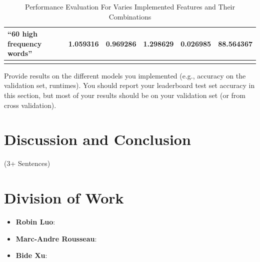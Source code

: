 \documentclass{amsart}
\theoremstyle{definition}
\theoremstyle{remark}
\numberwithin{equation}{section}
\begin{document}
\begin{table}[]
\begin{tabular}{|l|l|l|l|l|l|}
\textbf{“60 high frequency  words”}                                                                                                                                       & 1.059316                                                                    & 0.969286                                                                      & 1.298629                                                                   & 0.026985                                                            & 88.564367                                                                                                                                                     \\ \hline
                                                                                                                                                    \\ \hline
\end{tabular}
\caption{Performance Evaluation For Varies Implemented Features and Their Combinations}
\label{tbl:table_fp}
\end{table}


Provide results on the different models
you implemented (e.g., accuracy on the validation set, runtimes). You should report your leaderboard
test set accuracy in this section, but most of your results should be on your validation set (or from cross
validation).
\section{Discussion and Conclusion}(3+ Sentences)
\section{Division of Work}
\begin{itemize}
\item{\textbf{Robin Luo}}:
\item{\textbf{Marc-Andre Rousseau}}:
\item{\textbf{Bide Xu}}:
\end{itemize}



\def\IEEEbibitemsep{0pt plus .5pt}

%
%

\end{document}
